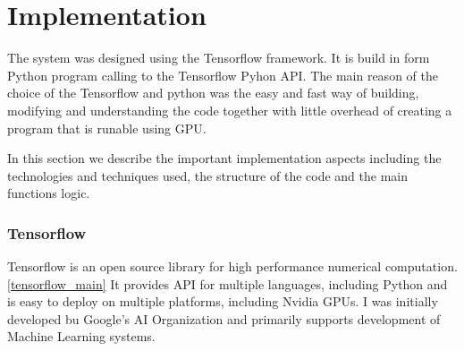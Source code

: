 
\chapter{Implementation}

The system was designed using the Tensorflow framework. 
It is build in form Python program calling to the Tensorflow Pyhon API.
The main reason of the choice of the Tensorflow and python was the easy and fast way of building, modifying and understanding the code together with little overhead of
creating a program that is runable using GPU. 

In this section we describe the important implementation aspects including the technologies and techniques used, the structure of the code and the main functions logic.

\subsection{Tensorflow}

Tensorflow is an open source library for high performance numerical computation.\ref{tensorflow_main} 
It provides API for multiple languages, including Python and is easy to deploy on multiple platforms, including Nvidia GPUs.
I was initially developed bu Google's AI Organization and primarily supports development of Machine Learning systems.

